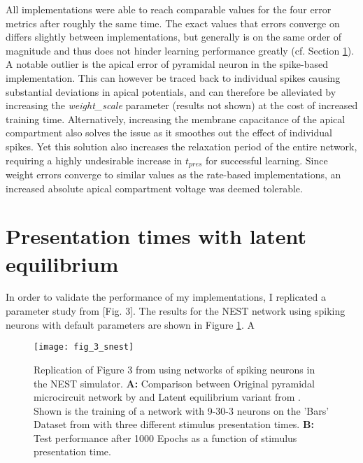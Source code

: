 All implementations were able to reach comparable values for the four error metrics after roughly the same time. The
exact values that errors converge on differs slightly between implementations, but generally is on the same order of
magnitude and thus does not hinder learning performance greatly (cf. Section \ref{sec-le-tpres}). A notable outlier is
the apical error of pyramidal neuron in the spike-based implementation. This can however be traced back to individual
spikes causing substantial deviations in apical potentials, and can therefore be alleviated by increasing the
\textit{weight\_scale} parameter (results not shown) at the cost of increased training time. Alternatively, increasing
the membrane capacitance of the apical compartment also solves the issue as it smoothes out the effect of individual
spikes. Yet this solution also increases the relaxation period of the entire network, requiring a highly undesirable
increase in $t_{pres}$ for successful learning. Since weight errors converge to similar values as the rate-based
implementations, an increased absolute apical compartment voltage was deemed tolerable.


\section{Presentation times with latent equilibrium}\label{sec-le-tpres}

In order to validate the performance of my implementations, I replicated a parameter study from \cite{Haider2021}[Fig.
    3]. The results for the NEST network using spiking neurons with default parameters  are
    shown in Figure \ref{fig-bars-le-snest}. A



\begin{figure}[t]
    \centering
    \texttt{[image: fig\_3\_snest]}
    \caption{Replication of Figure 3 from \cite{Haider2021} using networks of spiking neurons in the NEST simulator.
        \textbf{A:} Comparison between Original pyramidal microcircuit network by \cite{sacramento2018dendritic} and
        Latent equilibrium variant from \cite{Haider2021}. Shown is the training of a network with 9-30-3 neurons on the
        'Bars' Dataset from  with three different stimulus presentation times. \textbf{B:} Test
        performance after 1000 Epochs as a function of stimulus presentation time.}
    \label{fig-bars-le-snest}
\end{figure}


